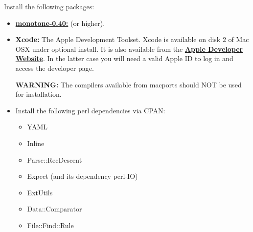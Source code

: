 \documentclass[12pt]{article}
\begin{document}
Install the following packages:
\begin{itemize}
   \item[]\href{http://monotone.ca/}{\bf monotone-0.40:} (or higher).
   \item[]{\bf Xcode:} The Apple Development Toolset. Xcode is available on disk 2 of Mac OSX under optional install. It is also available from the \href{http://developer.apple.com/technology/xcode.html}{\bf Apple Developer Website}. In the latter case  you will need a valid Apple ID to log in and access the developer page.
   
   {\bf WARNING:} The compilers available from macports should NOT be used for installation.
   \item[]Install the following perl dependencies via CPAN:
      \begin{itemize}
         \item YAML
         \item Inline
         \item Parse::RecDescent
         \item Expect (and its dependency perl-IO)
         \item ExtUtils
         \item Data::Comparator
         \item File::Find::Rule
      \end{itemize}
   \end{itemize}
   
\end{document}
